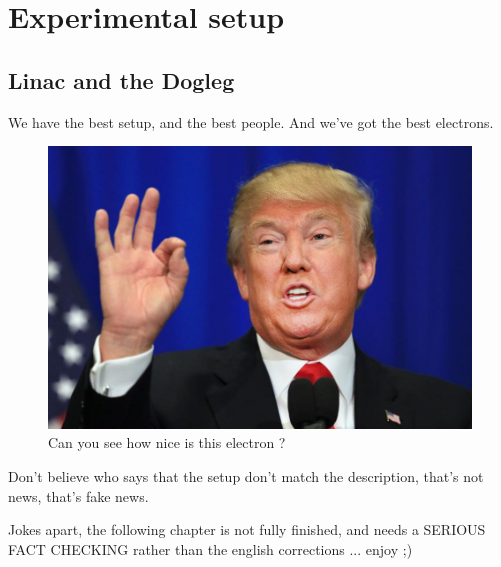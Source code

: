 \chapter[Experimental setup]{Experimental setup}

\section[Linac and dogleg]{Linac and the Dogleg}

We have the best setup, and the best people. And we've got the best electrons. 

\begin{figure}[h]
\centering 
\includegraphics[scale=0.3]{pictures/trump.jpeg}
\caption{Can you see how nice is this electron ?}
\label{injlayout}
\end{figure}

Don't believe who says that the setup don't match the description, that's not news, that's fake news.

\vspace{10mm}
Jokes apart, the following chapter is not fully finished, and needs a SERIOUS FACT CHECKING rather than the english corrections ... enjoy ;)
